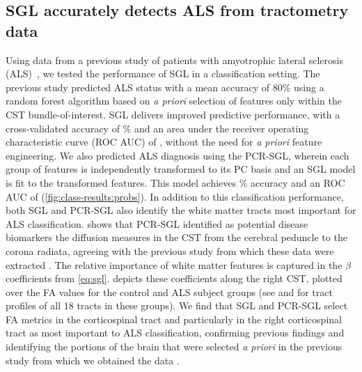 \documentclass[10pt,letterpaper]{article}
\begin{document}
\subsection*{SGL accurately detects ALS from tractometry data}

Using data from a previous study of patients with amyotrophic lateral sclerosis (ALS)~\cite{sarica2017corticospinal}, we tested the performance of SGL in a
classification setting. The previous study predicted ALS status with a mean
accuracy of 80\% using a random forest algorithm based on \emph{a priori}
selection of features only within the CST bundle-of-interest.
SGL delivers improved predictive performance, with a cross-validated accuracy
of {\alsAccuracy}\% and an area under the receiver operating characteristic
curve (ROC AUC) of {\alsRocAuc}, without the need for \emph{a priori} feature
engineering.
We also predicted ALS diagnosis using the PCR-SGL, wherein each group of features is independently transformed to its PC basis and an SGL model is fit to the transformed features. This model achieves \protect{\alsAccuracyGpca}\% accuracy and an ROC AUC of \protect{\alsRocAucGpca}
(\cref{fig:class-results:probs}). In addition to this classification
performance, both SGL and PCR-SGL also identify
the white matter tracts most important for ALS classification.
 shows that PCR-SGL identified as potential disease biomarkers the diffusion measures in the CST from the cerebral peduncle to the corona radiata, agreeing with the previous study from which these data were extracted \cite{sarica2017corticospinal}.
The relative importance of white matter
features is captured in the $\beta$ coefficients from \cref{eq:sgl}.
 depicts these coefficients along the
right CST, plotted over the FA values for the control and ALS subject groups
(see  and  for tract profiles of all 18 tracts in these groups).
We find that SGL and PCR-SGL select FA metrics in the corticospinal tract and
particularly in the right corticospinal tract as most important to ALS
classification, confirming previous findings \cite{van2011upper,
toosy2003diffusion, sarica2014tractography, sage2007quantitative,
sage2009quantitative, karlsborg2004corticospinal, ellis1999diffusion,
cosottini2005diffusion, ciccarelli2009investigation, abe2010voxel} and
identifying the portions of the brain that were selected \emph{a priori} in
the previous study from which we obtained the data
\cite{sarica2017corticospinal}.
\end{document}
